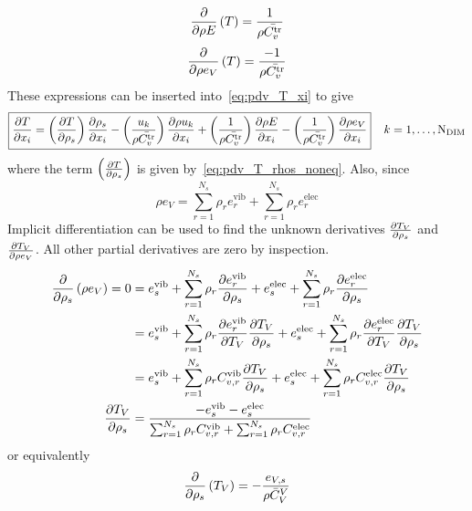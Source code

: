 \begin{equation}
  {\frac{\partial{}}{\partial{\rho E}}}\left(T\right) = \frac{1}{\rho\bar{C^{\text{tr}}_v}}
\end{equation}
\begin{equation}
  {\frac{\partial{}}{\partial{\rho e_V}}}\left(T\right) = \frac{-1}{\rho\bar{C^{\text{tr}}_v}}
\end{equation}
These expressions can be inserted into~\eqref{eq:pdv_T_xi} to give
\begin{equation}
  \boxed{{\frac{\partial{T}}{\partial{x_i}}} = \left({\frac{\partial{T}}{\partial{\rho_s}}}\right){\frac{\partial{\rho_s}}{\partial{x_i}}} - \left(\frac{u_k}{\rho\bar{C^{\text{tr}}_v}}\right){\frac{\partial{\rho u_k}}{\partial{x_i}}} + \left(\frac{1}{\rho\bar{C^{\text{tr}}_v}}\right){\frac{\partial{\rho E}}{\partial{x_i}}} - \left(\frac{1}{\rho\bar{C^{\text{tr}}_v}}\right){\frac{\partial{\rho e_V}}{\partial{x_i}}}}\;\;\;\; k=1,\ldots,\text{N}_{\text{DIM}}
\end{equation}
where the term $ \left({\frac{\partial{T}}{\partial{\rho_s}}}\right)$ is given by~\eqref{eq:pdv_T_rhos_noneq}. Also, since 
\begin{equation*}
  \rho e_V = \sum_{r=1}^{N_s} \rho_r e^{\text{vib}}_r + \sum_{r=1}^{N_s} \rho_r e^{\text{elec}}_r 
\end{equation*}
Implicit differentiation can be used to find the unknown derivatives ${\frac{\partial{T_V}}{\partial{\rho_s}}}$ and ${\frac{\partial{T_V}}{\partial{\rho e_V}}}$.  All other partial derivatives are zero by inspection.
\begin{align*}
  {\frac{\partial{}}{\partial{\rho_s}}}\left(\rho e_V\right) = 0 &= e^{\text{vib}}_s + \sum_{r=1}^{N_s} \rho_r {\frac{\partial{e^{\text{vib}}_r}}{\partial{\rho_s}}} + e^{\text{elec}}_s + \sum_{r=1}^{N_s} \rho_r {\frac{\partial{e^{\text{elec}}_r}}{\partial{\rho_s}}} \\
                                          &= e^{\text{vib}}_s + \sum_{r=1}^{N_s} \rho_r {\frac{\partial{e^{\text{vib}}_r}}{\partial{T_V}}}{\frac{\partial{T_V}}{\partial{\rho_s}}} + e^{\text{elec}}_s + \sum_{r=1}^{N_s} \rho_r {\frac{\partial{e^{\text{elec}}_r}}{\partial{T_V}}}{\frac{\partial{T_V}}{\partial{\rho_s}}} \\
                                          &= e^{\text{vib}}_s + \sum_{r=1}^{N_s} \rho_r C^{\text{vib}}_{v,r}{\frac{\partial{T_V}}{\partial{\rho_s}}} + e^{\text{elec}}_s + \sum_{r=1}^{N_s} \rho_r C^{\text{elec}}_{v,r}{\frac{\partial{T_V}}{\partial{\rho_s}}} \\
                        {\frac{\partial{T_V}}{\partial{\rho_s}}} &= \frac{-e^{\text{vib}}_s - e^{\text{elec}}_s}{\sum_{r=1}^{N_s} \rho_r C^{\text{vib}}_{v,r} + \sum_{r=1}^{N_s} \rho_r C^{\text{elec}}_{v,r}}
\end{align*}
or equivalently
\begin{equation}
  {\frac{\partial{}}{\partial{\rho_s}}}\left(T_V\right) = -\frac{e_{V,s}}{\rho \bar{C}_V^V}
\end{equation}
